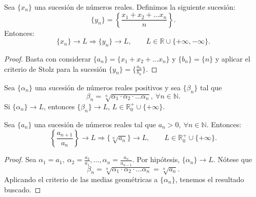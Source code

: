 \begin{coro}
    Sea $\{x_n\}$ una sucesión de números reales. Definimos la siguiente sucesión:
    \begin{equation*}
        \{y_n\} = \left\{\frac{x_1 + x_2 + \dots x_n}{n}\right\}.
    \end{equation*}
    Entonces:
    \begin{equation*}
        \{x_n\} \longrightarrow L \Longrightarrow \{y_n\} \longrightarrow L, \qquad L \in \mathbb{R} \cup \{+ \infty, -\infty\}.
    \end{equation*}
\end{coro}
\begin{proof}
    Basta con considerar $\{a_n\} = \{x_1 + x_2 + \dots x_n\}$ y $\{b_n\} = \{n\}$ y aplicar el criterio de Stolz para la sucesión $\{y_n\} = \{\frac{a_n}{b_n}\}$.
\end{proof}

\begin{coro}
    Sea $\{\alpha_n\}$ una sucesión de números reales positivos y sea $\{\beta_n\}$ tal que
    \begin{equation*}
        \beta_n = \sqrt[n]{\alpha_1 \cdot \alpha_2 \cdot \dots \alpha_n}, ~ \forall n \in \mathbb{N}.
    \end{equation*}
    Si $\{\alpha_n\} \longrightarrow L$, entonces $\{\beta_n\} \longrightarrow L$, $L \in \mathbb{R}^+_0 \cup \{+ \infty\}$.
\end{coro}

\begin{teo}
    Sea $\{a_n\}$ una sucesión de números reales tal que $a_n > 0, ~ \forall n \in \mathbb{N}$. Entonces:
    \begin{equation*}
        \left\{\frac{a_{n+1}}{a_n}\right\} \longrightarrow L \Longrightarrow \{\sqrt[n]{a_n}\} \longrightarrow L, \qquad L \in \mathbb{R}^+_0 \cup \{+ \infty\}.
    \end{equation*}
\end{teo}
\begin{proof}
    Sea $\alpha_1 = a_1, ~\alpha_2 = \frac{a_2}{a_1}, \dots, \alpha_n = \frac{a_{n}}{a_{n-1}}$. Por hipótesis, $\{\alpha_n\} \longrightarrow L$.
    Nótese que
    \begin{equation*}
        \beta_n = \sqrt[n]{\alpha_1 \cdot \alpha_2 \cdot \dots \alpha_n} = \sqrt[n]{a_n}.
    \end{equation*}
    Aplicando el criterio de las medias geométricas a $\{\alpha_n\}$, tenemos el resultado buscado.
\end{proof}

